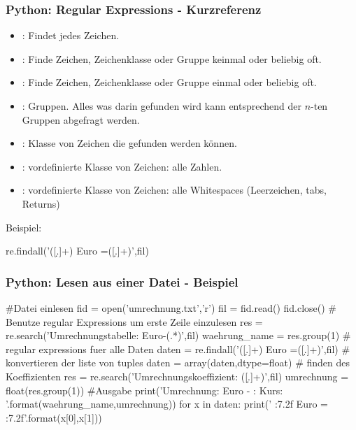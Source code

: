 \documentclass[hyperref={xetex}]{beamer}
\begin{document}
%
%
\begin{frame}[fragile]\frametitle{Python: Regular Expressions - Kurzreferenz}

  \begin{itemize}
    \item {}: Findet jedes Zeichen.
    \item \isage{*}: Finde Zeichen, Zeichenklasse oder Gruppe keinmal oder beliebig oft.
    \item \isage{+}: Finde Zeichen, Zeichenklasse oder Gruppe einmal oder beliebig oft.
    \item {}: Gruppen. Alles was darin gefunden wird kann entsprechend der $n$-ten Gruppen abgefragt werden.
    \item \isage{[..]}: Klasse von Zeichen die gefunden werden können.
    \item \isage{\\d}: vordefinierte Klasse von Zeichen: alle Zahlen.
    \item \isage{\\s}: vordefinierte Klasse von Zeichen: alle Whitespaces (Leerzeichen, tabs, Returns)
  \end{itemize}
  Beispiel:
  \begin{pyin}
re.findall('([\d.]+) Euro =\s*([\d.]+)',fil)
  \end{pyin}
\end{frame}
%
%
\begin{frame}[fragile]\frametitle{Python: Lesen aus einer Datei - Beispiel}
  \begin{pyin}
#Datei einlesen
fid = open('umrechnung.txt','r')
fil = fid.read()
fid.close()
# Benutze regular Expressions um erste Zeile einzulesen
res = re.search('Umrechnungstabelle: Euro-(.*)',fil)
waehrung_name = res.group(1)
# regular expressions fuer alle Daten
daten = re.findall('([\d.]+) Euro =\s*([\d.]+)',fil)
# konvertieren der liste von tuples 
daten = array(daten,dtype=float)
# finden des Koeffizienten 
res = re.search('Umrechnungskoeffizient: ([\d.]+)',fil)
umrechnung = float(res.group(1))
#Ausgabe
print('Umrechnung: Euro - {}: Kurs: {} \n'.format(waehrung_name,umrechnung))
for x in daten:
    print(' {:7.2f} Euro  = {:7.2f}'.format(x[0],x[1]))    
  \end{pyin}
\end{frame}
\end{document}
